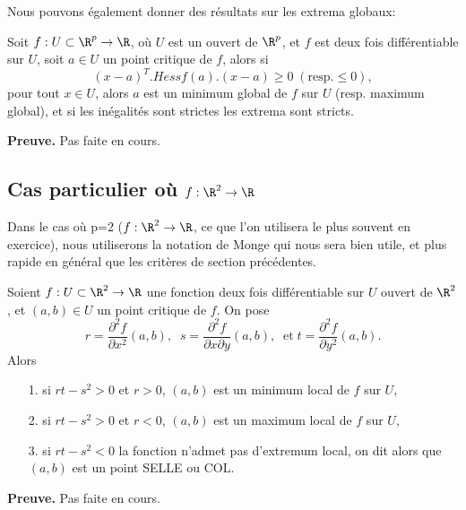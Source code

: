 \documentclass[12pt, class=report,crop=false]{standalone}
\begin{document}
{\noindent Nous pouvons également donner des résultats sur les extrema globaux:

\begin{theoreme}
\textcolor[rgb]{0.44,0.00,0.87}{ 
  Soit $f:U\subset \R^p \rightarrow \R$, où $U$ est un ouvert de $\R^p$, et $f$ est deux fois différentiable sur $U$, soit $a \in U$ un point critique de $f$,
  alors si 
  \begin{equation*}
  (x-a)^T.Hessf(a).(x-a) \geq 0 \;(\mathrm{resp.} \leq 0),
\end{equation*}   
pour tout $x \in U$, alors $a$ est un minimum global de $f$ sur $U$
(resp. maximum global), et si les inégalités sont strictes les extrema sont stricts.}
\end{theoreme}

{\textbf{Preuve.}} Pas faite en cours.

\subsection{Cas particulier où $f:\R^2 \rightarrow \R$}
Dans le cas où p=2 ($f:\R^2 \rightarrow \R$, ce que l'on utilisera le plus souvent en exercice), nous utiliserons la notation de Monge qui nous sera bien utile, et plus rapide en général que les critères de section précédentes. 
\begin{theoreme}
\textcolor[rgb]{0.44,0.00,0.87}{
   Soient $f:U \subset \R^2 \rightarrow \R$ une fonction deux fois différentiable sur  $U$ ouvert de $\R^2$, et $(a,b) \in U$ un point critique de $f$.
 On pose 
 \begin{equation*}
 r=\dfrac{\partial^2 f}{\partial x^2}(a,b),\;\;s=\dfrac{\partial^2 f}{\partial x \partial y}(a,b)
  ,\;\; \mathrm{et}\; t=\dfrac{\partial^2 f}{\partial y^2}(a,b).
\end{equation*}
Alors
 \begin{itemize}
 \item[1.]si $rt-s^2>0$ et $r>0$,  $(a,b)$ est un minimum local  de $f$ sur $U$,
 \item[2.] si $rt-s^2>0$ et $r<0$,  $(a,b)$ est un maximum local  de $f$ sur $U$,
 \item[3.]si $rt-s^2<0$ la fonction n'admet pas d'extremum local, on dit alors que $(a,b)$ est un point SELLE ou COL.
 \end{itemize}}
\end{theoreme}


{\textbf{Preuve.}} Pas faite en cours.

}
\end{document}
